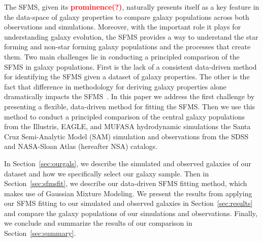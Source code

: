 \documentclass[preprint2,tighten]{aastex62}
\newcommand{\todo}[1]{{\bf \textcolor{red}{ #1}}}
\begin{document}
The SFMS, given its \todo{prominence(?)}, naturally presents itself as a key feature in the data-space of
galaxy properties to compare galaxy populations across both observations 
and simulations. Moreover, with the important role it plays for 
understanding galaxy evolution, the SFMS provides a way to understand the 
star forming and non-star forming galaxy populations and the processes 
that create them. Two main challenges lie in conducting a principled 
comparison of the SFMS in galaxy populations. First is the lack of a 
consistent data-driven method for identifying the SFMS given a dataset 
of galaxy properties. The other is the fact that difference in methodology 
for deriving galaxy properties alone dramatically impacts the 
SFMS~\citep[\emph{e.g.}][]{speagle2014}. 
In this paper we address the first challenge by presenting a flexible, 
data-driven method for fitting the SFMS. Then we use this method to conduct
a principled comparison of the central galaxy populations from the Illustris,
EAGLE, and MUFASA hydrodynamic simulations the Santa Cruz Semi-Analytic 
Model (SAM) simulation and observations from the SDSS and NASA-Sloan Atlas
(hereafter NSA) catalogs. 

In Section~\ref{sec:ourgals}, we describe the simulated and observed 
galaxies of our dataset and how we specifically select our galaxy sample. 
Then in Section~\ref{sec:sfmsfit}, we describe our data-driven SFMS 
fitting method, which makes use of Gaussian Mixture Modeling. We present 
the results from applying our SFMS fitting to our simulated and observed
galaxies in Section~\ref{sec:results} and compare the galaxy populations
of our simulations and observations. Finally, we conclude and summarize
the results of our comparison in Section~\ref{sec:summary}.
\end{document}
